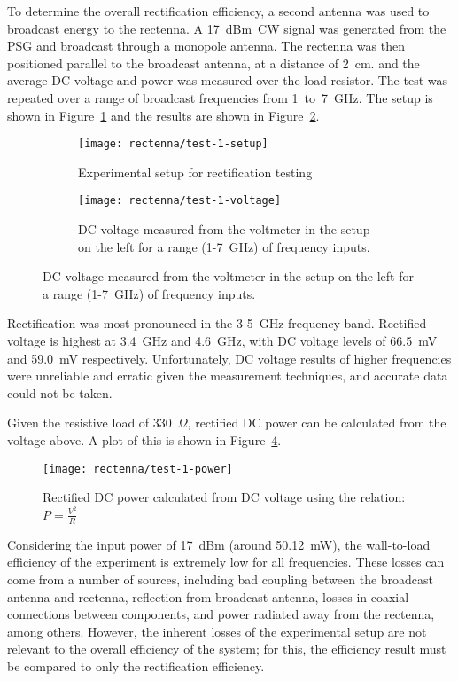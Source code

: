 To determine the overall rectification efficiency, a second antenna was used to broadcast energy to the rectenna. A 17~dBm~CW signal was generated from the PSG and broadcast through a monopole antenna. The rectenna was then positioned parallel to the broadcast antenna, at a distance of 2~cm. and the average DC voltage and power was measured over the load resistor. The test was repeated over a range of broadcast frequencies from 1~to~7~GHz. The setup is shown in Figure~\ref{fig:rectenna-test-1-setup} and the results are shown in Figure~\ref{fig:rectenna-test-1-voltage}.


\begin{figure}[h!]
    \centering
    \begin{subfigure}{.85\textwidth}
        \centering
        \texttt{[image: rectenna/test-1-setup]}
        \caption{Experimental setup for rectification testing}
        \label{fig:rectenna-test-1-setup}
    \end{subfigure}
    \begin{subfigure}{.85\textwidth}
        \centering
        \texttt{[image: rectenna/test-1-voltage]}
        \caption{DC voltage measured from the voltmeter in the setup on the left for a range (1-7~GHz) of frequency inputs.}
        \label{fig:rectenna-test-1-voltage}
    \end{subfigure}
    \label{fig:rectenna-test-1}
\end{figure}

Rectification was most pronounced in the 3-5~GHz frequency band. Rectified voltage is highest at 3.4~GHz and 4.6~GHz, with DC voltage levels of 66.5~mV and 59.0~mV respectively. Unfortunately, DC voltage results of higher frequencies were unreliable and erratic given the measurement techniques, and accurate data could not be taken.

Given the resistive load of 330~$\Omega$, rectified DC power can be calculated from the voltage above. A plot of this is shown in Figure~\ref{fig:rectenna-test-1-power}.

\begin{figure}[h!]
\centering
\texttt{[image: rectenna/test-1-power]}
    \caption[Rectified DC power]{Rectified DC power calculated from DC voltage using the relation: $P = \frac{V^2}{R}$}
    \label{fig:rectenna-test-1-power}
\end{figure}


Considering the input power of 17~dBm (around 50.12~mW), the wall-to-load efficiency of the experiment is extremely low for all frequencies. These losses can come from a number of sources, including bad coupling between the broadcast antenna and rectenna, reflection from broadcast antenna, losses in coaxial connections between components, and power radiated away from the rectenna, among others. However, the inherent losses of the experimental setup are not relevant to the overall efficiency of the system; for this, the efficiency result must be compared to only the rectification efficiency.

